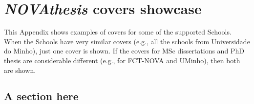 
%

\chapter{\emph{NOVAthesis} covers showcase}
\label{app:covers_showcase}

This Appendix shows examples of covers for some of the supported Schools.  When the Schools have very similar covers (e.g., all the schools from Universidade do Minho), just one cover is shown.  If the covers for MSc dissertations and PhD  thesis are considerable different (e.g., for FCT-NOVA and UMinho), then both are shown.

\newcommand{\showcasecoversize}{0.3\textwidth}
\newcommand*{\myhfill}{}
\newcommand{\myincludeimage}[1]{%
    \myhfill%
    \defifundef{\mycvbox}{\newsavebox}%
    \savebox{\mycvbox}{\texttt{[image: \#1]}}%
    \defifundef{\mycvboxht}{\newlength}%
    \setlength{\mycvboxht}{\dimexpr \showcasecoversize*\paperheight/\paperwidth}%
    \rule{0pt}{1.1\mycvboxht}%
    \setlength{\fboxsep}{0pt}%
    \fbox{\texttt{[image: \#1]}}%
    \renewcommand*{\myhfill}{\hfill}%
}


\lipsum[1-20]

\section{A section here}

\lipsum[1-20]
